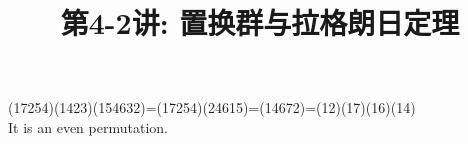 \documentclass[a4paper, justified]{tufte-handout}
\title{第4-2讲: 置换群与拉格朗日定理}
\date{\zhtoday} %
\begin{document}
\maketitle
\noplagiarism %
\begin{abstract}
\end{abstract}
\beginrequired

\begin{problem}[TJ 5-3(d)]
\end{problem}

\begin{solution}
(17254)(1423)(154632)=(17254)(24615)=(14672)=(12)(17)(16)(14)\\
It is an even permutation.
\end{solution}

\begin{problem}
\end{problem}
\end{document}
